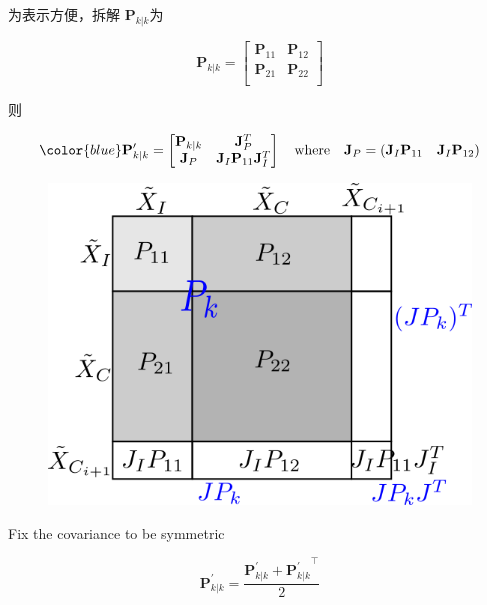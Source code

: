 \documentclass[12pt,a4paper]{article}
\begin{document}
为表示方便，拆解 $\mathbf{P}_{k|k}$为

\begin{equation}
\mathbf{P}_{k|k} =
\begin{bmatrix}
\mathbf{P}_{11} & \mathbf{P}_{12} \\
\mathbf{P}_{21} & \mathbf{P}_{22} \\
\end{bmatrix}
\end{equation}

则

\begin{equation}
{\color{blue}
\mathbf{P}_{k|k}^{\prime} =
\begin{bmatrix}
\mathbf{P}_{k|k} & \mathbf{J}_P^T \\
\mathbf{J}_P & \mathbf{J}_I \mathbf{P}_{11} \mathbf{J}_I^T
\end{bmatrix}
\quad \text{where} \quad
\mathbf{J}_P = \left(\mathbf{J}_I \mathbf{P}_{11} \quad \mathbf{J}_I \mathbf{P}_{12}\right)
}
\end{equation}

\begin{figure}[H]
\centering
\includegraphics[scale=0.45]{images/visual_conv_augmentation.png}
\end{figure}

Fix the covariance to be symmetric

\begin{equation}
\mathbf{P}_{k|k}^{\prime} = 
\frac{\mathbf{P}_{k|k}^{\prime} + {\mathbf{P}_{k|k}^{\prime}}^{\top}}{2}
\end{equation}
\end{document}
